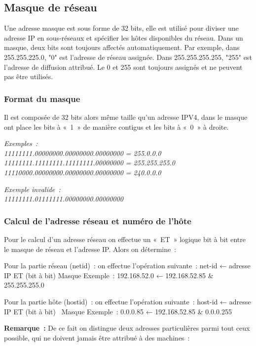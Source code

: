 \subsection{Masque de réseau}

Une adresse masque est sous forme de 32 bits, elle est utilisé pour diviser
une adresse IP en sous-réseaux et spécifier les hôtes disponibles du réseau.
Dans un masque, deux bits sont toujours affectés automatiquement. Par exemple,
dans 255.255.225.0, "0" est l'adresse de réseau assignée. Dans 255.255.255.255,
"255" est l'adresse de diffusion attribué. Le 0 et 255 sont toujours assignés
et ne peuvent pas être utilisés.


\subsubsection{Format du masque}
Il est composée de 32 bits alors même taille qu’un adresse IPV4, dans le masque
ont place les bits à « 1 » de manière contigus et les bits à « 0 » à droite.

\vspace{1cm}
{\it Exemples :\\
11111111.00000000.00000000.00000000 =   255.0.0.0\\
11111111.11111111.11111111.00000000 =   255.255.255.0\\
11110000.00000000.00000000.00000000 =   240.0.0.0 
}

\vspace{1cm}
{\it Exemple invalide :\\
11111111.01111111.00000000.00000000
}

\vspace{1cm}

\subsubsection{Calcul de l’adresse réseau et numéro de l’hôte}
Pour le calcul d’un adresse réseau on effectue un « ET » logique bit à bit
entre le masque de réseau et l’adresse IP. Alors on détermine :

Pour la partie réseau (netid) : on effectue l’opération suivante :
    net-id ← adresse IP ET (bit à bit) Masque
Exemple : 192.168.52.0 ← 192.168.52.85  &  255.255.255.0

Pour la partie hôte (hostid) : on effectue l’opération suivante :
    host-id ← adresse IP ET (bit à bit) ~Masque
Exemple : 0.0.0.85 ← 192.168.52.85 & 0.0.0.255

\textbf{ Remarque :}
De ce fait on distingue deux adresses particulières parmi tout ceux possible,
qui ne doivent jamais être attribué à des machines :

